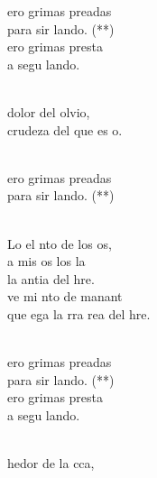 \documentclass[12pt]{article}
\begin{document}
\begin{multicols*}{2}
\begin{cancion}%
	\begin{chorus}%
	ero grimas preadas \\
	para sir lando. (**)\\
	ero grimas presta  \\
	a segu lando. \\
	\end{chorus}%
	\jump\\
	 dolor del olvio, \\
	 crudeza del que es o.\\\jump\\
	\begin{chorus}%
	ero grimas preadas \\
	para sir lando. (**) \\
	\end{chorus}%
	\jump\\
	Lo el nto de los os,\\
	a mis os los la \\
	la antia del hre.\\
	ve mi nto de manant \\
	que ega la rra rea del hre.\\\jump\\
	\begin{chorus}%
	ero grimas preadas \\
	para sir lando. (**) \\
	ero grimas presta  \\
	a segu lando. \\
	\end{chorus}%
	\jump\\
	 hedor de la cca, \\

\end{cancion}
\end{multicols*}
\end{document}

